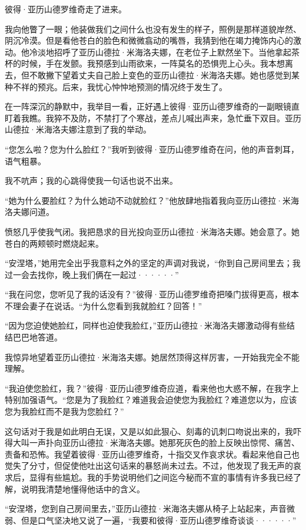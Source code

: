 \documentclass[12pt, UTF8]{ctexbook}
\begin{document}
\par 彼得·亚历山德罗维奇走了进来。
\par 我向他瞥了一眼；他装做我们之间什么也没有发生的样子，照例是那样道貌岸然、阴沉冷漠。但是看他苍白的脸色和微微翕动的嘴唇，我猜到他在竭力掩饰内心的激动。他冷淡地招呼了亚历山德拉·米海洛夫娜，在老位子上默然坐下。当他拿起茶杯的时候，手在发颤。我预感到山雨欲来，一阵莫名的恐惧兜上心头。我本想离去，但不敢撇下望着丈夫自己脸上变色的亚历山德拉·米海洛夫娜。她也感觉到某种不祥的预兆。后来，我忧心忡忡地预测的情况终于发生了。
\par 在一阵深沉的静默中，我举目一看，正好遇上彼得·亚历山德罗维奇的一副眼镜直盯着我瞧。我猝不及防，不禁打了个寒战，差点儿喊出声来，急忙垂下双目。亚历山德拉·米海洛夫娜注意到了我的举动。
\par “您怎么啦？您为什么脸红？”我听到彼得·亚历山德罗维奇在问，他的声音刺耳，语气粗暴。
\par 我不吭声；我的心跳得使我一句话也说不出来。
\par “她为什么要脸红？为什么她动不动就脸红？”他放肆地指着我向亚历山德拉·米海洛夫娜问道。
\par 愤怒几乎使我气闭。我把恳求的目光投向亚历山德拉·米海洛夫娜。她会意了。她苍白的两颊顿时燃烧起来。
\par “安涅塔，”她用完全出乎我意料之外的坚定的声调对我说，“你到自己房间里去；我过一会去找你，晚上我们俩在一起过······”
\par “我在问您，您听见了我的话没有？”彼得·亚历山德罗维奇把嗓门拔得更高，根本不理会妻子在说话。“为什么您看到我就脸红？回答！”
\par “因为您迫使她脸红，同样也迫使我脸红，”亚历山德拉·米海洛夫娜激动得有些结结巴巴地答道。
\par 我惊异地望着亚历山德拉·米海洛夫娜。她居然顶得这样厉害，一开始我完全不能理解。
\par “我迫使您脸红，我？”彼得·亚历山德罗维奇应道，看来他也大惑不解，在我字上特别加强语气。“您是为了我脸红？难道我会迫使您为我脸红？难道您以为，应该您为我脸红而不是我为您脸红？”
\par 这句话对于我是如此明白无误，又是以如此狠心、刻毒的讥刺口吻说出来的，我吓得大叫一声扑向亚历山德拉·米海洛夫娜。她那死灰色的脸上反映出惊愕、痛苦、责备和恐怖。我望着彼得·亚历山德罗维奇，十指交叉作哀求状。看起来他自己也觉失了分寸，但促使他吐出这句话来的暴怒尚未过去。不过，他发现了我无声的哀求后，显得有些尴尬。我的手势说明他们之间迄今秘而不宣的事情有许多我已经了解，说明我清楚地懂得他话中的含义。
\par “安涅塔，您到自己房间里去，”亚历山德拉·米海洛夫娜从椅子上站起来，声音微弱、但是口气坚决地又说了一遍，“我要和彼得·亚历山德罗维奇谈谈······”
\end{document}
